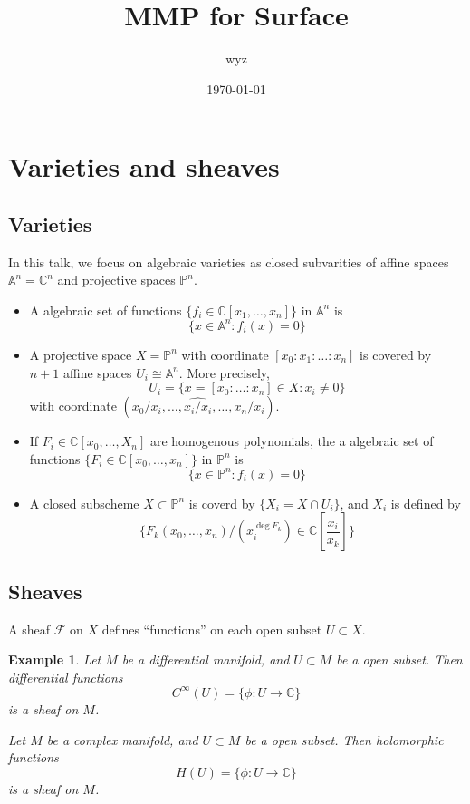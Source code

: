\documentclass{article}
\title{MMP for Surface}
\author{wyz}
\date{\today}
\newtheorem{exa}[defn]{Example}
\begin{document}
\maketitle
\section{Varieties and sheaves}
\subsection{Varieties}
In this talk, we focus on algebraic varieties as closed subvarities of affine spaces $\mathbb{A}^{n}=\mathbb{C}^{n}$ and projective spaces $\mathbb{P}^{n}$.
\begin{itemize}
	\item A algebraic set of functions $\{f_{i} \in \mathbb{C}[x_1,\ldots ,x_{n}]\} $ in $\mathbb{A}^{n}$  is
	      \[
		      \{x\in \mathbb{A}^{n}: f_{i}(x)=0\}
	      \]
	\item A projective space $X=\mathbb{P}^{n}$ with coordinate $[x_0:x_1:\ldots :x_{n}]$ is covered by $n+1$ affine spaces $U_{i}\cong \mathbb{A}^{n}$. More precisely,
	      \[
		      U_{i}=\{x=[x_{0}:\ldots :x_{n}]\in X: x_{i}\neq 0 \}
	      \]
	      with coordinate $(x_{0}/x_{i},\ldots ,\hat{x_{i}/x_{i}},\ldots ,x_{n}/x_{i})$.
	\item If $F_{i}\in \mathbb{C}[x_0,\ldots ,X_{n}]$ are homogenous polynomials, the a algebraic set of functions $\{F_{i} \in \mathbb{C}[x_0,\ldots ,x_{n}]\} $ in $\mathbb{P}^{n}$  is
	      \[
		      \{x\in \mathbb{P}^{n}: f_{i}(x)=0\}
	      \]
	\item A closed subscheme $X \subset \mathbb{P}^{n}$ is coverd by $\{X_{i}=X \cap U_{i}\} $, and $X_{i}$ is defined by
	      \[
		      \{F_{k}(x_{0},\ldots ,x_{n})/(x_{i}^{\deg F_{k}})\in \mathbb{C}[ \frac{x_{i}}{x_{k}}]\}
	      \]
\end{itemize}

\subsection{Sheaves}
A sheaf $\mathcal{F}$ on $X$ defines ``functions'' on each open subset $U \subset X$.
\begin{exa}
	\itme Let $M$ be a differential manifold, and $U \subset M$ be a open subset. Then differential functions
	\[
		C^{\infty}(U)=\{\phi: U \to \mathbb{C}\}
	\]
	is a sheaf on $M$.
	\item Let $M$ be a complex manifold, and $U \subset M$ be a open subset. Then holomorphic functions
	\[
		H(U)=\{\phi: U \to \mathbb{C}\}
	\]
	is a sheaf on $M$.
\end{exa}
\end{document}
